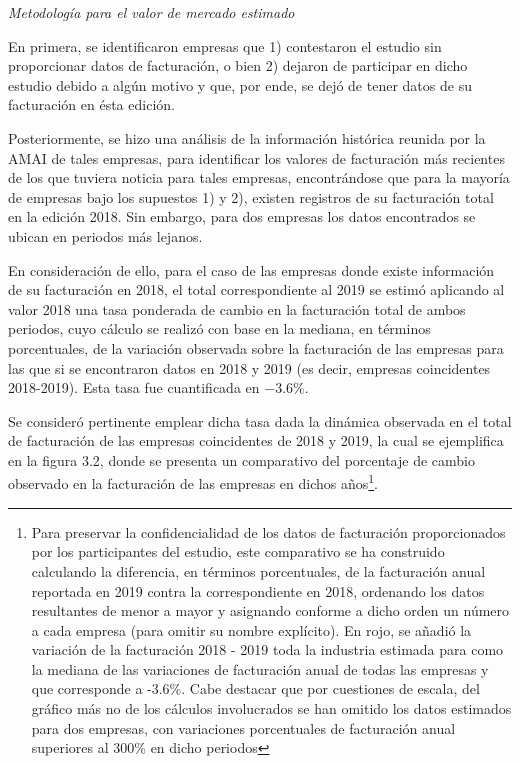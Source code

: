 \noindent \emph{Metodología para el valor de mercado estimado}

\noindent En primera, se identificaron empresas que 1) contestaron el estudio sin proporcionar datos de facturación, o bien 2) dejaron de participar en dicho  estudio debido a algún motivo y que, por ende, se dejó de tener datos de su facturación en ésta edición.

Posteriormente, se hizo una análisis de la información histórica reunida por la AMAI de tales empresas, para identificar los valores de facturación más recientes de los que tuviera noticia para tales empresas, encontrándose que para la mayoría de empresas bajo los supuestos 1) y 2), existen registros de su facturación total en la edición 2018. Sin embargo, para dos empresas los datos encontrados se ubican en periodos más lejanos.

En consideración de ello, para el caso de las empresas donde existe información de su facturación en 2018, el total correspondiente al 2019 se estimó aplicando al valor 2018 una tasa ponderada de cambio en la facturación total de ambos periodos, cuyo cálculo se realizó con base en la mediana, en términos porcentuales, de la variación observada sobre la facturación de las empresas para las que si se encontraron datos en 2018 y 2019 (es decir, empresas coincidentes 2018-2019). Esta tasa fue cuantificada en $-3.6\%$.

Se consideró pertinente emplear dicha tasa dada la dinámica observada en el total de facturación de las empresas coincidentes de 2018 y 2019, la cual se ejemplifica en la figura 3.2, donde se presenta un comparativo del porcentaje de cambio observado en la facturación de las empresas en dichos años\footnote{Para preservar la confidencialidad de los datos de facturación proporcionados por los participantes del estudio, este comparativo se ha construido calculando la diferencia, en términos porcentuales, de la facturación anual reportada en 2019 contra la correspondiente en 2018, ordenando los datos resultantes de menor a mayor y asignando conforme a dicho orden un número a cada empresa (para omitir su nombre explícito). En rojo, se añadió la variación de la facturación 2018 - 2019 toda la industria estimada para como la mediana de las variaciones de facturación anual de todas las empresas y que corresponde a -3.6\%. Cabe destacar que por cuestiones de escala, del gráfico más no de los cálculos involucrados se han omitido los datos estimados para dos empresas, con variaciones porcentuales de facturación anual superiores al 300\% en dicho periodos }.

